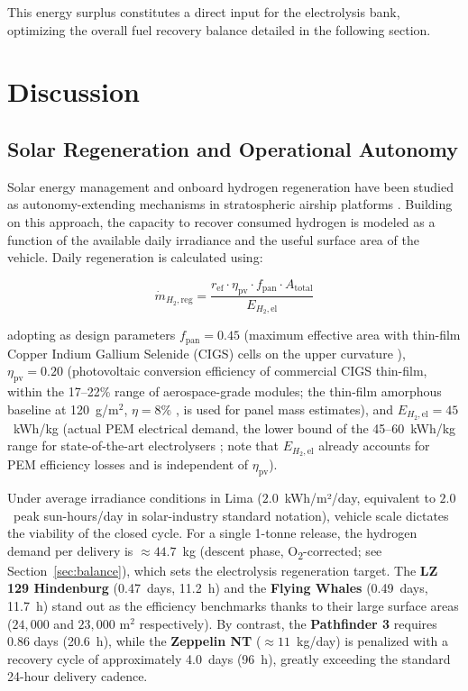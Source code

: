 \documentclass[applsci,article,submit,pdftex,moreauthors]{Definitions/mdpi}
\begin{document}
This energy surplus constitutes a direct input for the electrolysis bank, optimizing the overall fuel recovery balance detailed in the following section.



\section{Discussion}

\subsection{Solar Regeneration and Operational Autonomy}
Solar energy management and onboard hydrogen regeneration have been studied as autonomy-extending mechanisms in stratospheric airship platforms \cite{Zhang2019, Sun2024}. Building on this approach, the capacity to recover consumed hydrogen is modeled as a function of the available daily irradiance and the useful surface area of the vehicle. Daily regeneration is calculated using:

\begin{equation}
\dot{m}_{H_2,\text{reg}} = \frac{r_\text{ef}\cdot \eta_\text{pv}\cdot f_\text{pan}\cdot A_\text{total}}{E_{H_2,\text{el}}}
\label{eq:regen}
\end{equation}

adopting as design parameters $f_\text{pan} = 0.45$ (maximum effective area with thin-film Copper Indium Gallium Selenide (CIGS) cells on the upper curvature \cite{Gao2024}), $\eta_\text{pv} = 0.20$ (photovoltaic conversion efficiency of commercial CIGS thin-film, within the 17--22\% range of aerospace-grade modules; the thin-film amorphous baseline at 120~g/m$^2$, $\eta = 8\%$ \cite{Pande2018}, is used for panel mass estimates), and $E_{H_2,\text{el}} = 45$~kWh/kg (actual PEM electrical demand, the lower bound of the 45--60~kWh/kg range for state-of-the-art electrolysers \cite{Letsios2026, Esmaeili2023PEM}; note that $E_{H_2,\text{el}}$ already accounts for PEM efficiency losses and is independent of $\eta_\text{pv}$).


Under average irradiance conditions in Lima ($2.0$~kWh/m²/day, equivalent to $2.0$~peak sun-hours/day in solar-industry standard notation), vehicle scale dictates the viability of the closed cycle. For a single 1-tonne release, the hydrogen demand per delivery is ${\approx}44.7$~kg (descent phase, O\textsubscript{2}-corrected; see Section~\ref{sec:balance}), which sets the electrolysis regeneration target. The \textbf{LZ 129 Hindenburg} (0.47~days, 11.2~h) and the \textbf{Flying Whales} (0.49~days, 11.7~h) stand out as the efficiency benchmarks thanks to their large surface areas ($24{,}000$ and $23{,}000\text{ m}^2$ respectively). By contrast, the \textbf{Pathfinder 3} requires 0.86 days (20.6~h), while the \textbf{Zeppelin NT} (${\approx}11$~kg/day) is penalized with a recovery cycle of approximately 4.0~days (96~h), greatly exceeding the standard 24-hour delivery cadence.
\end{document}
